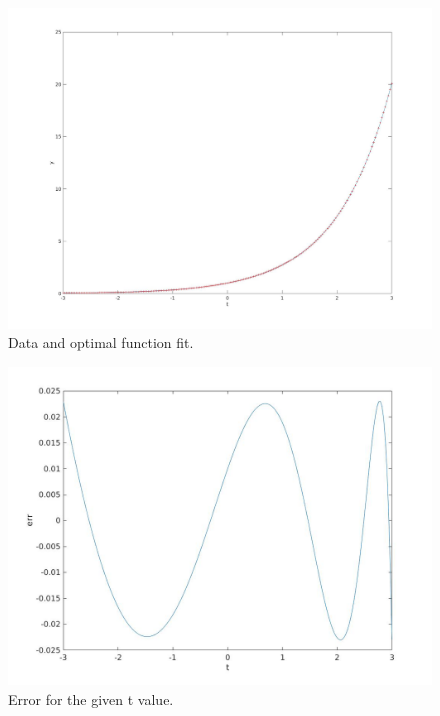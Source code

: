 \documentclass[12pt]{article}
\begin{document}
\begin{figure}[h]
\centering
\includegraphics[scale=.2]{52_1.jpg}
\caption{Data and optimal function fit.}
\end{figure}
\begin{figure}[h]
\centering
\includegraphics[scale=.30]{52_2.jpg}
\caption{Error for the given t value.}
\end{figure}
\end{document}
